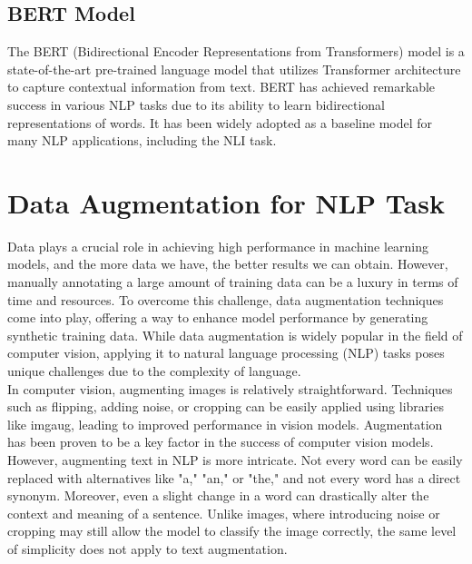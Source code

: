 \documentclass[11pt]{article}
\begin{document}
\subsection{BERT Model}

The BERT (Bidirectional Encoder Representations from Transformers) model is a state-of-the-art pre-trained language model that utilizes Transformer architecture to capture contextual information from text.\cite{devlin2018bert} BERT has achieved remarkable success in various NLP tasks due to its ability to learn bidirectional representations of words. It has been widely adopted as a baseline model for many NLP applications, including the NLI task.


\section{Data Augmentation for NLP Task}

Data plays a crucial role in achieving high performance in machine learning models, and the more data we have, the better results we can obtain. However, manually annotating a large amount of training data can be a luxury in terms of time and resources. To overcome this challenge, data augmentation techniques come into play, offering a way to enhance model performance by generating synthetic training data. While data augmentation is widely popular in the field of computer vision, applying it to natural language processing (NLP) tasks poses unique challenges due to the complexity of language.\\

In computer vision, augmenting images is relatively straightforward. Techniques such as flipping, adding noise, or cropping can be easily applied using libraries like imgaug, leading to improved performance in vision models. Augmentation has been proven to be a key factor in the success of computer vision models.\\

However, augmenting text in NLP is more intricate. Not every word can be easily replaced with alternatives like "a," "an," or "the," and not every word has a direct synonym. Moreover, even a slight change in a word can drastically alter the context and meaning of a sentence. Unlike images, where introducing noise or cropping may still allow the model to classify the image correctly, the same level of simplicity does not apply to text augmentation.\\
\end{document}
